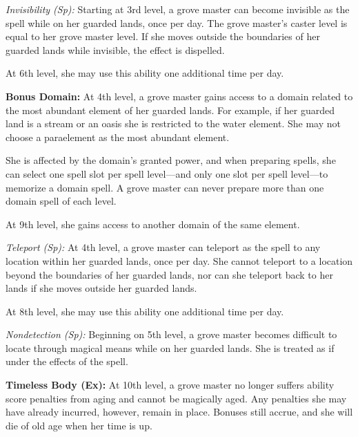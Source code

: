 {\textit{Invisibility (Sp):} Starting at 3rd level, a grove master can become invisible as the  spell while on her guarded lands, once per day. The grove master's caster level is equal to her grove master level. If she moves outside the boundaries of her guarded lands while invisible, the effect is dispelled.

At 6th level, she may use this ability one additional time per day.

\textbf{Bonus Domain:} At 4th level, a grove master gains access to a domain related to the most abundant element of her guarded lands. For example, if her guarded land is a stream or an oasis she is restricted to the water element. She may not choose a paraelement as the most abundant element.

She is affected by the domain's granted power, and when preparing spells, she can select one spell slot per spell level---and only one slot per spell level---to memorize a domain spell. A grove master can never prepare more than one domain spell of each level.

At 9th level, she gains access to another domain of the same element.

\textit{Teleport (Sp):} At 4th level, a grove master can teleport as the  spell to any location within her guarded lands, once per day. She cannot teleport to a location beyond the boundaries of her guarded lands, nor can she teleport back to her lands if she moves outside her guarded lands.

At 8th level, she may use this ability one additional time per day.

\textit{Nondetection (Sp):} Beginning on 5th level, a grove master becomes difficult to locate through magical means while on her guarded lands. She is treated as if under the effects of the  spell.

\textbf{Timeless Body (Ex):} At 10th level, a grove master no longer suffers ability score penalties from aging and cannot be magically aged. Any penalties she may have already incurred, however, remain in place. Bonuses still accrue, and she will die of old age when her time is up.
}

